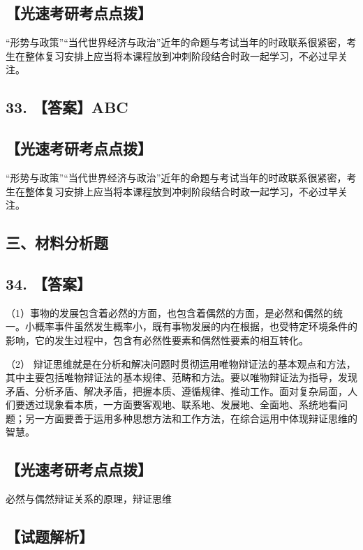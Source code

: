\documentclass[UTF8,11pt]{ctexart}
\begin{document}
\subsection*{【光速考研考点点拨】}

“形势与政策”“当代世界经济与政治”近年的命题与考试当年的时政联系很紧密，考生在整体复习安排上应当将本课程放到冲刺阶段结合时政一起学习，不必过早关注。


\subsection*{33. 【答案】ABC}

\subsection*{【光速考研考点点拨】}

“形势与政策”“当代世界经济与政治”近年的命题与考试当年的时政联系很紧密，考生在整体复习安排上应当将本课程放到冲刺阶段结合时政一起学习，不必过早关注。


\subsection*{三、材料分析题}

\subsection*{34. 【答案】}

（1）事物的发展包含着必然的方面，也包含着偶然的方面，是必然和偶然的统一。小概率事件虽然发生概率小，既有事物发展的内在根据，也受特定环境条件的影响，它的发生过程中，包含有必然性要素和偶然性要素的相互转化。


（2） 辩证思维就是在分析和解决问题时贯彻运用唯物辩证法的基本观点和方法，其中主要包括唯物辩证法的基本规律、范畴和方法。要以唯物辩证法为指导，发现矛盾、分析矛盾、解决矛盾，把握本质、遵循规律、推动工作。面对复杂局面，人们要透过现象看本质，一方面要客观地、联系地、发展地、全面地、系统地看问题；另一方面要善于运用多种思想方法和工作方法，在综合运用中体现辩证思维的智慧。


\subsection*{【光速考研考点点拨】}

必然与偶然辩证关系的原理，辩证思维


\subsection*{【试题解析】}
\end{document}
